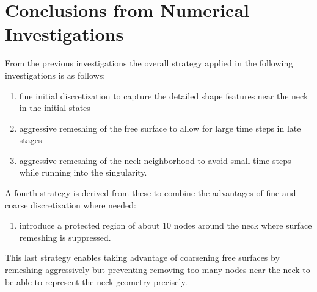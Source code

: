 \section{Conclusions from Numerical Investigations}\label{sec:numerical-conclusion}

From the previous investigations the overall strategy applied in the following investigations is as follows:
\begin{enumerate}
    \item fine initial discretization to capture the detailed shape features near the neck in the initial states
    \item aggressive remeshing of the free surface to allow for large time steps in late stages
    \item aggressive remeshing of the neck neighborhood to avoid small time steps while running into the singularity.
\end{enumerate}
A fourth strategy is derived from these to combine the advantages of fine and coarse discretization where needed:
\begin{enumerate}[resume]
    \item introduce a protected region of about \num{10} nodes around the neck where surface remeshing is suppressed.
\end{enumerate}
This last strategy enables taking advantage of coarsening free surfaces by remeshing aggressively but preventing removing too many nodes near the neck to be able to represent the neck geometry precisely.
